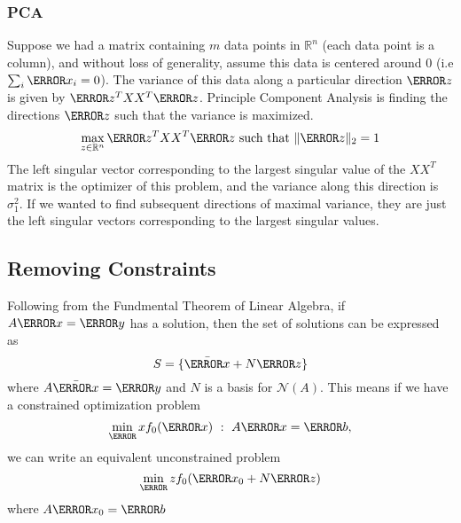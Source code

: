 \subsubsection{PCA}
Suppose we had a matrix containing $m$ data points in $\mathbb{R}^n$ (each data point is a column), and without loss of generality, assume this data is centered around 0 (i.e $\sum_i \V{x}_i = 0$).
The variance of this data along a particular direction $\V{z}$ is given by $\V{z}^TXX^T\V{z}$.
Principle Component Analysis is finding the directions $\V{z}$ such that the variance is maximized.
\[
	\max_{z\in\mathbb{R}^n} \V{z}^TXX^T\V{z} \text{ such that } \|\V{z}\|_2 = 1
\]
The left singular vector corresponding to the largest singular value of the $XX^T$ matrix is the optimizer of this problem, and the variance along this direction is $\sigma_1^2$.
If we wanted to find subsequent directions of maximal variance, they are just the left singular vectors corresponding to the largest singular values.
\subsection{Removing Constraints}
Following from the Fundmental Theorem of Linear Algebra, if $A\V{x}=\V{y}$ has a solution, then the set of solutions can be expressed as
\[
	S = \{\bar{\V{x}} + N\V{z}\}
\]
where $A\bar{\V{x}}=\V{y}$ and $N$ is a basis for $\mathcal{N}(A)$.
This means if we have a constrained optimization problem
\[
	\min_\V{x} f_0(\V{x}) \ : \ A\V{x} = \V{b},
\]
we can write an equivalent unconstrained problem \[
	\min_\V{z} f_0(\V{x}_0 + N\V{z})
\]
where $A\V{x}_0 = \V{b}$

